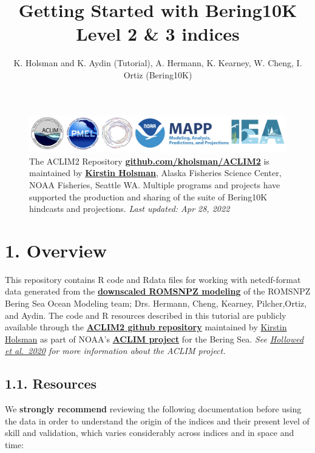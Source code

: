 \documentclass[
]{article}
\title{Getting Started with Bering10K Level 2 \& 3 indices}
\author{K. Holsman and K. Aydin (Tutorial), A. Hermann, K. Kearney, W.
Cheng, I. Ortiz (Bering10K)}
\date{}
\begin{document}
\maketitle

{
\setcounter{tocdepth}{2}
\tableofcontents
}
\begin{figure}
\centering
\includegraphics[width=1\textwidth,height=\textheight]{Figs/logos2.jpg}
\caption{The ACLIM2 Repository
\href{https://github.com/kholsman/ACLIM2}{\textbf{github.com/kholsman/ACLIM2}}
is maintained by \textbf{\href{mailto:kirstin.holsman@noaa.gov}{Kirstin
Holsman}}, Alaska Fisheries Science Center, NOAA Fisheries, Seattle WA.
Multiple programs and projects have supported the production and sharing
of the suite of Bering10K hindcasts and projections. \emph{Last updated:
Apr 28, 2022}}
\end{figure}

\hypertarget{overview}{%
\section{1. Overview}\label{overview}}

This repository contains R code and Rdata files for working with
netcdf-format data generated from the
\href{https://beringnpz.github.io/roms-bering-sea}{\textbf{downscaled
ROMSNPZ modeling}} of the ROMSNPZ Bering Sea Ocean Modeling team; Drs.
Hermann, Cheng, Kearney, Pilcher,Ortiz, and Aydin. The code and R
resources described in this tutorial are publicly available through the
\href{https://github.com/kholsman/ACLIM2}{\textbf{ACLIM2 github
repository}} maintained by
\href{mailto:kirstin.holsman@noaa.gov}{Kirstin Holsman} as part of
NOAA's
\href{https://www.fisheries.noaa.gov/alaska/ecosystems/alaska-climate-integrated-modeling-project}{\textbf{ACLIM
project}} for the Bering Sea. \emph{See
\href{https://www.frontiersin.org/articles/10.3389/fmars.2019.00775/full}{Hollowed
et al.~2020} for more information about the ACLIM project.}

\hypertarget{resources}{%
\subsection{1.1. Resources}\label{resources}}

We \textbf{strongly recommend} reviewing the following documentation
before using the data in order to understand the origin of the indices
and their present level of skill and validation, which varies
considerably across indices and in space and time:
\end{document}

